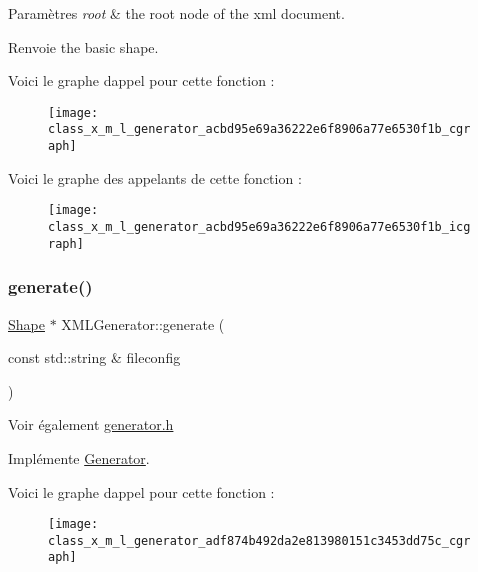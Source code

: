 \begin{DoxyParams}{Paramètres}
{\em root} & the root node of the xml document. \\
\hline
\end{DoxyParams}
\begin{DoxyReturn}{Renvoie}
the basic shape. 
\end{DoxyReturn}
Voici le graphe d\textquotesingle{}appel pour cette fonction \+:
\nopagebreak
\begin{figure}[H]
\begin{center}
\leavevmode
\texttt{[image: class\_x\_m\_l\_generator\_acbd95e69a36222e6f8906a77e6530f1b\_cgraph]}
\end{center}
\end{figure}
Voici le graphe des appelants de cette fonction \+:
\nopagebreak
\begin{figure}[H]
\begin{center}
\leavevmode
\texttt{[image: class\_x\_m\_l\_generator\_acbd95e69a36222e6f8906a77e6530f1b\_icgraph]}
\end{center}
\end{figure}
\mbox{\label{class_x_m_l_generator_adf874b492da2e813980151c3453dd75c}} 
\subsubsection{\texorpdfstring{generate()}{generate()}}
{\footnotesize\ttfamily \hyperlink{class_shape}{Shape} $\ast$ X\+M\+L\+Generator\+::generate (\begin{DoxyParamCaption}\item[{const std\+::string \&}]{fileconfig }\end{DoxyParamCaption})\hspace{0.3cm}{\ttfamily [virtual]}}

\begin{DoxySeeAlso}{Voir également}
\hyperlink{generator_8h}{generator.\+h} 
\end{DoxySeeAlso}


Implémente \hyperlink{class_generator_a0a421843bba544df32c3e10478eaabc7}{Generator}.

Voici le graphe d\textquotesingle{}appel pour cette fonction \+:
\nopagebreak
\begin{figure}[H]
\begin{center}
\leavevmode
\texttt{[image: class\_x\_m\_l\_generator\_adf874b492da2e813980151c3453dd75c\_cgraph]}
\end{center}
\end{figure}
\mbox{\label{class_x_m_l_generator_a0030450c03ad82fe328e27382bcfe011}} 
